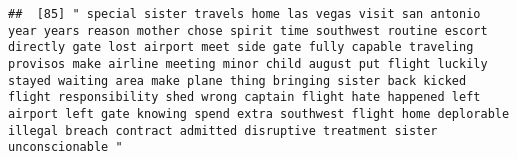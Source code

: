 \documentclass[
]{article}
\begin{document}
\begin{verbatim}
##  [85] " special sister travels home las vegas visit san antonio year years reason mother chose spirit time southwest routine escort directly gate lost airport meet side gate fully capable traveling provisos make airline meeting minor child august put flight luckily stayed waiting area make plane thing bringing sister back kicked flight responsibility shed wrong captain flight hate happened left airport left gate knowing spend extra southwest flight home deplorable illegal breach contract admitted disruptive treatment sister unconscionable "                                                                                                                                                                                                                                                                                                                                                                                                                                                                                                                                                                                                                                                                                                                                                                                                                                                                                                                                                                                                                                                                                                                                                                                                                                    

\end{verbatim}
\end{document}
